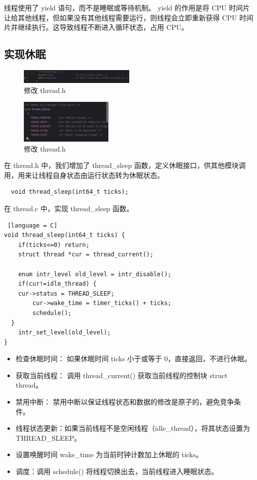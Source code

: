 线程使用了 yield 语句，而不是睡眠或等待机制。
yield 的作用是将 CPU 时间片让给其他线程，但如果没有其他线程需要运行，则线程会立即重新获得 CPU 时间片并继续执行。这导致线程不断进入循环状态，占用 CPU。

\subsection{实现休眠}

\begin{figure}[H]
\centering
    \includegraphics[width=0.5\textwidth]{img4/thread.png}
    \caption{修改 thread.h}
    \label{fig:pintos}
\end{figure}

\begin{figure}[H]
  \centering
  \includegraphics[width=0.4\textwidth]{img4/sleep_thread.png}
  \caption{修改 thread.h}
  \label{fig:pintos}
\end{figure}

在 thread.h 中，我们增加了 thread\_sleep 函数，定义休眠接口，供其他模块调用，用来让线程自身状态由运行状态转为休眠状态。

\begin{lstlisting}
  void thread_sleep(int64_t ticks);
\end{lstlisting}

在 thread.c 中，实现 thread\_sleep 函数。

\begin{lstlisting} [language = C]
void thread_sleep(int64_t ticks) {
	if(ticks<=0) return;
  	struct thread *cur = thread_current();

	enum intr_level old_level = intr_disable();
	if(cur!=idle_thread) {
  	cur->status = THREAD_SLEEP;
		cur->wake_time = timer_ticks() + ticks;
		schedule();
  }
	intr_set_level(old_level);
}
\end{lstlisting}

\begin{itemize}
  \item 检查休眠时间： 如果休眠时间 ticks 小于或等于 0，直接返回，不进行休眠。
  \item 获取当前线程： 调用 thread\_current() 获取当前线程的控制块 struct thread。
  \item 禁用中断： 禁用中断以保证线程状态和数据的修改是原子的，避免竞争条件。
  \item 线程状态更新：如果当前线程不是空闲线程（idle\_thread），将其状态设置为 THREAD\_SLEEP。
  \item 设置唤醒时间 wake\_time 为当前时钟计数加上休眠的 ticks。
  \item 调度：调用 schedule() 将线程切换出去，当前线程进入睡眠状态。
\end{itemize}

